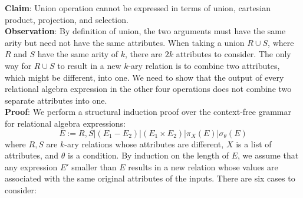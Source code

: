 \textbf{Claim}: Union operation cannot be expressed in terms of union, cartesian product, projection, and selection. \\
  \textbf{Observation}: By definition of union, the two arguments must have the same arity but need not have the same attributes. 
  When taking a union $R \cup S$, where $R$ and $S$ have the same arity of $k$, there are $2k$ attributes to consider. The only 
  way for $R \cup S$ to result in a new $k$-ary relation is to combine two attributes, which might be different, into one. 
  We need to show that the output of every relational algebra expression in the other four operations does not combine two separate 
  attributes into one. \\ 
  \textbf{Proof}: We perform a structural induction proof over the context-free grammar for relational algebra expressions:
  \begin{equation*}
    E := R, S | (E_1 - E_2) | (E_1 \times E_2) | \pi_{X}(E) | \sigma_{\theta}(E)
  \end{equation*}
  where $R, S$ are $k$-ary relations whose attributes are different, $X$ is a list of attributes, and $\theta$ is a condition. 
  By induction on the length of $E$, we assume that any expression $E'$ smaller than $E$ results in a new relation whose 
  values are associated with the same original attributes of the inputs. There are six cases to consider: 
